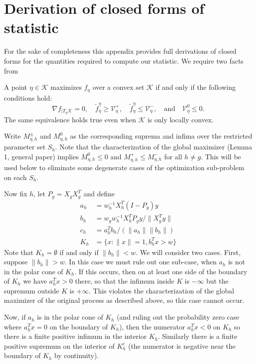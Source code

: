 \documentclass{imsart}
\newcommand{\norm}[1]{\lVert #1 \rVert}
\newcommand{\grad}{\nabla}
\newcommand{\V}{\mathcal{V}}\endlocaldefs
\newcommand{\K}{\mathcal{K}}
\newcommand\tf{\widetilde{f}}
\begin{document}
\appendix
\section{Derivation of closed forms of statistic}

For the sake of completeness this appendix provides full derivations
of closed forms for the quantities required to compute our
statistic. We require two facts from \cite{tests:adaptive}

A point $\eta \in \K$ maximizes $f_\eta$ over a convex
set $\K$ if and only if the following conditions hold: 
\begin{equation}
\label{eq:maxcond}
\grad f_{|T_{\eta}\K} = 0, \quad
\tf^{\eta}_{\eta} \geq \V^+_{\eta}, \quad
\tf^{\eta}_{\eta} \leq \V^-_{\eta}, \quad \text{and} \quad
\V^0_{\eta} \leq 0.
\end{equation}
The same equivalence holds true even when $\K$ is only locally
convex. 

Write $M^{\pm}_{\eta, h}$ and $M^0_{\eta, h}$ as the corresponding suprema and infima over the restricted parameter set $S_h$. Note that the characterization of the global maximizer (Lemma 1, general paper) implies $M^0_{\eta, h} \leq 0$ and $M^+_{\eta, h} \leq M^-_{\eta, h}$ for all $h \neq g$. This will be used below to eliminate some degenerate cases of the optimization sub-problem on each $S_h$.

Now fix $h$, let $P_g = X_gX_g^T$ and define
\begin{align*}
a_h &= w_h^{-1} X_h^T (I-P_g) y \\
b_h &= w_g w_h^{-1} X_h^T P_g y / \norm{X_g^T y} \\
c_h &= a_h^T b_h / (\norm{a_h} \norm{b_h}) \\
K_h   &= \{ x : \norm{x} = 1, b_h^Tx > w \}
\end{align*}
Note that $K_h = \emptyset$ if and only if $\norm{b_h} < w$. We will consider two cases. First, suppose $\norm{b_h} > w$. In this case we must rule out one sub-case, when $a_h$ is not in the polar cone of $K_h$. If this occurs, then on at least one side of the boundary of $K_h$ we have $a_h^Tx > 0$ there, so that the infimum inside $K$ is $-\infty$ but the supremum outside $K$ is $+\infty$. This violates the characterization of the global maximizer of the original process as described above, so this case cannot occur.

Now, if $a_h$ is in the polar cone of $K_h$ (and ruling out the probability zero case where $a_h^Tx = 0$ on the boundary of $K_h$), then the numerator $a_h^Tx < 0$ on $K_h$ so there is a finite positive infimum in the interior $K_h$. Similarly there is a finite positive supremum on the interior of $K_h^c$ (the numerator is negative near the boundary of $K_h$ by continuity).
\end{document}
